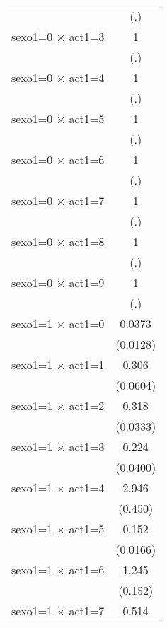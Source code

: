 {\begin{tabular}{l*{1}{c}}
                    &         (.)         \\
[1em]
sexo1=0 $\times$ act1=3&           1         \\
                    &         (.)         \\
[1em]
sexo1=0 $\times$ act1=4&           1         \\
                    &         (.)         \\
[1em]
sexo1=0 $\times$ act1=5&           1         \\
                    &         (.)         \\
[1em]
sexo1=0 $\times$ act1=6&           1         \\
                    &         (.)         \\
[1em]
sexo1=0 $\times$ act1=7&           1         \\
                    &         (.)         \\
[1em]
sexo1=0 $\times$ act1=8&           1         \\
                    &         (.)         \\
[1em]
sexo1=0 $\times$ act1=9&           1         \\
                    &         (.)         \\
[1em]
sexo1=1 $\times$ act1=0&      0.0373\sym{***}\\
                    &    (0.0128)         \\
[1em]
sexo1=1 $\times$ act1=1&       0.306\sym{***}\\
                    &    (0.0604)         \\
[1em]
sexo1=1 $\times$ act1=2&       0.318\sym{***}\\
                    &    (0.0333)         \\
[1em]
sexo1=1 $\times$ act1=3&       0.224\sym{***}\\
                    &    (0.0400)         \\
[1em]
sexo1=1 $\times$ act1=4&       2.946\sym{***}\\
                    &     (0.450)         \\
[1em]
sexo1=1 $\times$ act1=5&       0.152\sym{***}\\
                    &    (0.0166)         \\
[1em]
sexo1=1 $\times$ act1=6&       1.245         \\
                    &     (0.152)         \\
[1em]
sexo1=1 $\times$ act1=7&       0.514\sym{***}\\

\end{tabular}}
